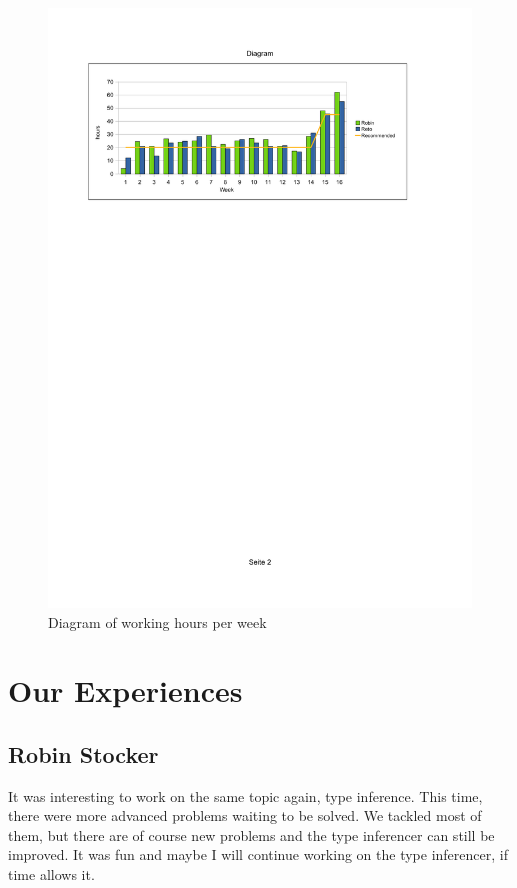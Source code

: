 \documentclass[12pt,halfparskip,DIV11,BCOR10mm]{scrreprt}
\begin{document}
\begin{figure}[H]
 \centering
 \includegraphics[width=\textwidth, trim=50 570 90 70, clip=true]{project/working_hours}
 \caption{Diagram of working hours per week}
 \label{fig:working_hours}
\end{figure}

\section{Our Experiences}

\subsection{Robin Stocker}


It was interesting to work on the same topic again, type inference. This time, there were more advanced problems waiting to be solved. We tackled most of them, but there are of course new problems and the type inferencer can still be improved. It was fun and maybe I will continue working on the type inferencer, if time allows it.
\end{document}
